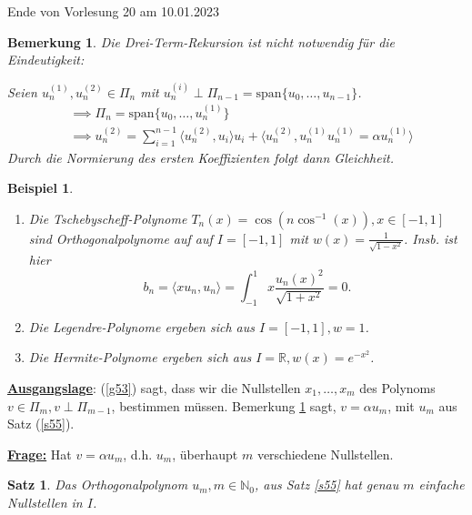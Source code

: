 \documentclass{book}
\newtheorem{theorem}[algorithm]{Satz}
\newtheorem{remark}[algorithm]{Bemerkung}
\newtheorem{example}[algorithm]{Beispiel}
\def\R{\mathbb{R}}
\def\N{\mathbb{N}}
\begin{document}
            \noindent
            \xrfill[0.7ex]{1pt}Ende von Vorlesung 20 am 10.01.2023\xrfill[0.7ex]{1pt}

            \begin{remark}\label{b56}
                Die Drei-Term-Rekursion ist nicht notwendig für die Eindeutigkeit:

                Seien $u_n^{(1)},u_n^{(2)}\in\Pi_n$ mit $u_n^{(i)}\perp \Pi_{n-1}=\text{span}\{u_0,\dots,u_{n-1}\}$.
                \begin{align*}
                    &\implies\Pi_n=\text{span}\{u_0,\dots,u_n^{(1)}\}\\
                    &\implies u_n^{(2)}=\sum_{i=1}^{n-1}\langle u_n^{(2)},u_i \rangle u_i + \langle u_n^{(2)},u_n^{(1)}u_n^{(1)}=\alpha u_n^{(1)} \rangle
                \end{align*}
                Durch die Normierung des ersten Koeffizienten folgt dann Gleichheit. 
            \end{remark}

            \begin{example}\label{b57}
                \begin{enumerate}
                    \item Die Tschebyscheff-Polynome $T_n(x)=\cos(n\cos^{-1}(x)),x\in[-1,1]$ sind Orthogonalpolynome auf 
                          auf $I=[-1,1]$ mit $w(x)=\frac{1}{\sqrt{1-x^2}}$.
                          Insb. ist hier \[b_n=\langle xu_n,u_n \rangle=\int_{-1}^1x\frac{u_n(x)^2}{\sqrt{1+x^2}}=0.\]
                    \item Die Legendre-Polynome ergeben sich aus $I=[-1,1],w=1$.
                    \item Die Hermite-Polynome ergeben sich aus $I=\R,w(x)=e^{-x^2}$.
                \end{enumerate}
            \end{example}

            \underline{\textbf{Ausgangslage}}: (\ref{g53}) sagt, dass wir die Nullstellen $x_1,\dots,x_m$ des Polynoms $v\in\Pi_m,v\perp\Pi_{m-1}$, bestimmen
            müssen. Bemerkung \ref{b56} sagt, $v=\alpha u_m$, mit $u_m$ aus Satz (\ref{s55}).

            \underline{\textbf{Frage:}} Hat $v=\alpha u_m$, d.h. $u_m$, überhaupt $m$ verschiedene Nullstellen.

            \begin{theorem}\label{s58}
                Das Orthogonalpolynom $u_m, m\in\N_0$, aus Satz \ref{s55} hat genau $m$ einfache Nullstellen in $I$.
            \end{theorem}
\end{document}

